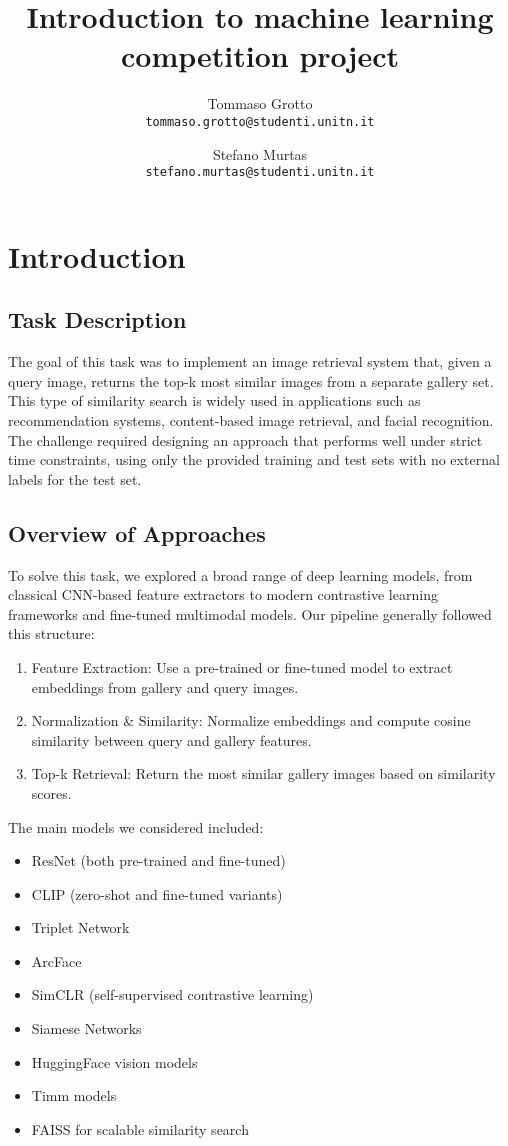 \documentclass[10pt,twocolumn,letterpaper]{article}
\title{Introduction to machine learning competition project}
\author{Tommaso Grotto\\\texttt{tommaso.grotto@studenti.unitn.it}\\\and Stefano Murtas\\\texttt{stefano.murtas@studenti.unitn.it}}
\begin{document}
\maketitle

\section{Introduction}
\subsection{Task Description}
The goal of this task was to implement an image retrieval system that, given a query image, returns the top-k most similar images from a separate gallery set. This type of similarity search is widely used in applications such as recommendation systems, content-based image retrieval, and facial recognition. The challenge required designing an approach that performs well under strict time constraints, using only the provided training and test sets with no external labels for the test set.

\subsection{Overview of Approaches}
To solve this task, we explored a broad range of deep learning models, from classical CNN-based feature extractors to modern contrastive learning frameworks and fine-tuned multimodal models. Our pipeline generally followed this structure:

\begin{enumerate}
  \item Feature Extraction: Use a pre-trained or fine-tuned model to extract embeddings from gallery and query images.
  \item Normalization \& Similarity: Normalize embeddings and compute cosine similarity between query and gallery features.
  \item Top-k Retrieval: Return the most similar gallery images based on similarity scores.
\end{enumerate}

The main models we considered included:
\begin{itemize}
  \item ResNet (both pre-trained and fine-tuned)
  \item CLIP (zero-shot and fine-tuned variants)
  \item Triplet Network
  \item ArcFace
  \item SimCLR (self-supervised contrastive learning)
  \item Siamese Networks
  \item HuggingFace vision models
  \item Timm models
  \item FAISS for scalable similarity search
\end{itemize}
\end{document}
